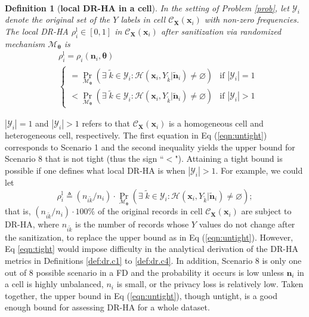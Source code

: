 \documentclass[10pt,journal,compsoc]{IEEEtran}
\newtheorem{defn}{\vspace{-6pt}\\ Definition}
\newcommand{\M}{\mathcal{M}}
\newcommand{\n}{\mathbf{n}}
\newcommand{\X}{\mathbf{X}}
\newcommand{\x}{\mathbf{x}}
\newcommand{\C}{\mathcal{C}}
\newcommand{\bs}{\boldsymbol}
\begin{document}
\begin{defn}[\textbf{local DR-HA in a cell}] \label{def:dr.c0}
In the setting of Problem \ref{prob}, let $\mathcal{Y}_{i}$ denote the original set of the $Y$ labels in cell $\C_{\X}(\x_i)$ with non-zero frequencies. The local DR-HA $\rho^{\text{l}}_i\in[0,1]$ in $\C_{\X}(\x_i)$ after sanitization via randomized mechanism $\M_{\bs\theta}$ is \vspace{-4pt}
\begin{align}
&\rho^{\text{l}}_i\!=\!\rho_i(\n_i,\bs\theta)\label{eqn:untight0}\\
&\begin{cases}
=\Pr_{\M_{\bs\theta}}(\exists\; \tilde{k}\!\in\!\mathcal{Y}_i\!:\!\mathcal{H}(\x_i,Y_{\tilde{k}}|\tilde{\n}_i)\!\ne\! \varnothing) & \mbox{if }|\mathcal{Y}_i|\!=\!1\\
<\Pr_{\M_{\bs\theta}}(\exists\;\tilde{k}\!\in\!\mathcal{Y}_i\!:\!\mathcal{H}(\x_i,Y_{\tilde{k}}|\tilde{\n}_i) \!\ne\!\varnothing) & \mbox{if }|\mathcal{Y}_i|>1\!\label{eqn:untight}
\end{cases}
\end{align}
\end{defn}
\vspace{-6pt}
$|\mathcal{Y}_i|\!=\!1$  and $|\mathcal{Y}_i|\!>\!1$  refers to that $\C_{\X}(\x_i)$ is a homogeneous cell and  heterogeneous cell, respectively. The first equation  in Eq (\ref{eqn:untight}) corresponds to Scenario 1 and the second inequality yields the upper bound for Scenario 8 that is not tight (thus  the sign ``$<$").  Attaining a tight bound is possible if one defines what local DR-HA is when $|\mathcal{Y}_i|>1$. For example, we could let
\begin{equation}\label{eqn:tight}
\textstyle 
\rho^{\text{l}}_i\!\triangleq\!(n_{i\tilde{k}}/n_i)\cdot\Pr_{\M_{\bs\theta}}(\exists\; \tilde{k}\!\in\!\mathcal{Y}_i\!:\!\mathcal{H}(\x_i,Y_{\tilde{k}}|\tilde{\n}_i)\!\ne\!\varnothing);
\end{equation}
that is,  $(n_{i\tilde{k}}/n_i)\cdot 100\%$ of the original records in cell $\C_{\X}(\x_i)$ are subject to DR-HA, where $n_{i\tilde{k}}$ is the number of records whose $Y$ values do not change after the sanitization, to replace the upper bound as in  Eq (\ref{eqn:untight}). However,  Eq \eqref{eqn:tight} would impose difficulty in the analytical derivation of the  DR-HA metrics in Definitions \ref{def:dr.c1} to \ref{def:dr.c4}. In addition, Scenario 8 is only one out of 8 possible scenario in a FD and the probability it occurs is low unless $\n_i$ in a cell is highly unbalanced, $n_i$ is small, or the privacy loss is relatively low. Taken together, the upper bound in  Eq (\ref{eqn:untight}), though untight, is a good enough bound for assessing DR-HA for a whole dataset. 
\end{document}
